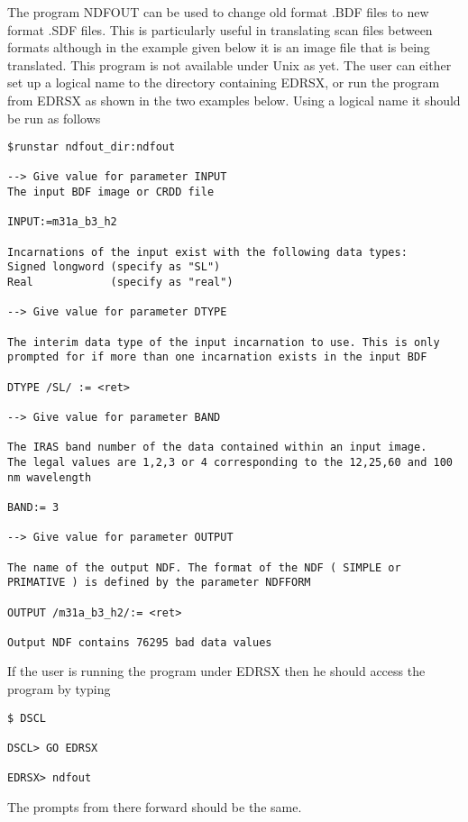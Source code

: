 \documentclass[twoside,11pt]{article}
\begin{document}
The program NDFOUT can be used to change old format .BDF files to new format
.SDF files. This is particularly useful in translating scan files between 
formats although in the example given below it is an image file that is being
translated. This program is not available under Unix as yet. The user can either
set up a logical name to the directory containing EDRSX, or run the program from
EDRSX as shown in the two examples below. Using a logical name it should be run
as follows
\begin{small}
\begin{verbatim}
$runstar ndfout_dir:ndfout

--> Give value for parameter INPUT
The input BDF image or CRDD file

INPUT:=m31a_b3_h2

Incarnations of the input exist with the following data types:
Signed longword (specify as "SL")
Real            (specify as "real")

--> Give value for parameter DTYPE

The interim data type of the input incarnation to use. This is only
prompted for if more than one incarnation exists in the input BDF

DTYPE /SL/ := <ret>

--> Give value for parameter BAND

The IRAS band number of the data contained within an input image.
The legal values are 1,2,3 or 4 corresponding to the 12,25,60 and 100 nm wavelength

BAND:= 3

--> Give value for parameter OUTPUT

The name of the output NDF. The format of the NDF ( SIMPLE or
PRIMATIVE ) is defined by the parameter NDFFORM

OUTPUT /m31a_b3_h2/:= <ret>

Output NDF contains 76295 bad data values
\end{verbatim}
\end{small}

If the user is running the program under EDRSX then he should access the program
by typing
\begin{small}
\begin{verbatim}
$ DSCL

DSCL> GO EDRSX

EDRSX> ndfout
\end{verbatim}
\end{small}

The prompts from there forward should be the same.
\end{document}

